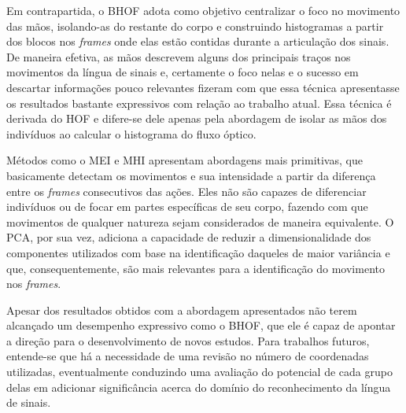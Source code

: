 Em contrapartida, o BHOF \cite{lim-2016} adota como objetivo centralizar o foco no movimento das mãos, isolando-as do restante do corpo e construindo histogramas a partir dos blocos nos \textit{frames} onde elas estão contidas durante a articulação dos sinais. De maneira efetiva, as mãos descrevem alguns dos principais traços nos movimentos da língua de sinais e, certamente o foco nelas e o sucesso em descartar informações pouco relevantes fizeram com que essa técnica apresentasse os resultados bastante expressivos com relação ao trabalho atual. Essa técnica é derivada do HOF e difere-se dele apenas pela abordagem de isolar as mãos dos indivíduos ao calcular o histograma do fluxo óptico.

Métodos como o MEI e MHI apresentam abordagens mais primitivas, que basicamente detectam os movimentos e sua intensidade a partir da diferença entre os \textit{frames} consecutivos das ações. Eles não são capazes de diferenciar indivíduos ou de focar em partes específicas de seu corpo, fazendo com que movimentos de qualquer natureza sejam considerados de maneira equivalente. O PCA, por sua vez, adiciona a capacidade de reduzir a dimensionalidade dos componentes utilizados com base na identificação daqueles de maior variância e que, consequentemente, são mais relevantes para a identificação do movimento nos \textit{frames}. 

Apesar dos resultados obtidos com a abordagem apresentados não terem alcançado um desempenho expressivo como o BHOF, que ele é capaz de apontar a direção para o desenvolvimento de novos estudos. Para trabalhos futuros, entende-se que há a necessidade de uma revisão no número de coordenadas utilizadas, eventualmente conduzindo uma avaliação do potencial de cada grupo delas em adicionar significância acerca do domínio do reconhecimento da língua de sinais.